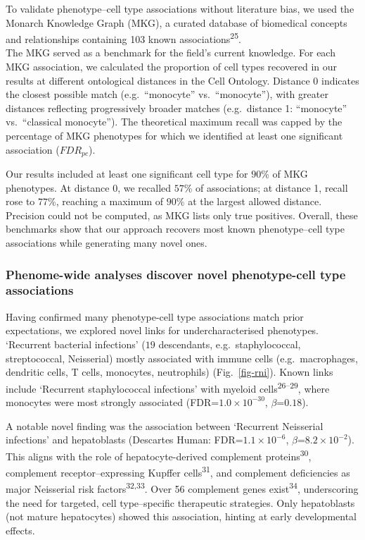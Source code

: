 \documentclass[
]{article}
\begin{document}
To validate phenotype--cell type associations without literature bias,
we used the Monarch Knowledge Graph (MKG), a curated database of
biomedical concepts and relationships containing 103 known
associations\textsuperscript{25}.\\
The MKG served as a benchmark for the field's current knowledge. For
each MKG association, we calculated the proportion of cell types
recovered in our results at different ontological distances in the Cell
Ontology. Distance 0 indicates the closest possible match
(e.g.~``monocyte'' vs.~``monocyte''), with greater distances reflecting
progressively broader matches (e.g.~distance 1: ``monocyte''
vs.~``classical monocyte''). The theoretical maximum recall was capped
by the percentage of MKG phenotypes for which we identified at least one
significant association (\(FDR_{pc}\)).

Our results included at least one significant cell type for \(90\)\% of
MKG phenotypes. At distance 0, we recalled \(57\)\% of associations; at
distance 1, recall rose to \(77\)\%, reaching a maximum of \(90\)\% at
the largest allowed distance. Precision could not be computed, as MKG
lists only true positives. Overall, these benchmarks show that our
approach recovers most known phenotype--cell type associations while
generating many novel ones.

\subsubsection{Phenome-wide analyses discover novel phenotype-cell type
associations}\label{phenome-wide-analyses-discover-novel-phenotype-cell-type-associations}

Having confirmed many phenotype-cell type associations match prior
expectations, we explored novel links for undercharacterised phenotypes.
`Recurrent bacterial infections' (\(19\) descendants,
e.g.~staphylococcal, streptococcal, Neisserial) mostly associated with
immune cells (e.g.~macrophages, dendritic cells, T cells, monocytes,
neutrophils) (Fig.~\ref{fig-rni}). Known links include `Recurrent
staphylococcal infections' with myeloid cells\textsuperscript{26--29},
where monocytes were most strongly associated
(FDR=\(1.0 \times 10^{-30}\), \(\beta\)=\(0.18\)).

A notable novel finding was the association between `Recurrent
Neisserial infections' and hepatoblasts (Descartes Human:
FDR=\(1.1 \times 10^{-6}\), \(\beta\)=\(8.2 \times 10^{-2}\)). This
aligns with the role of hepatocyte-derived complement
proteins\textsuperscript{30}, complement receptor--expressing Kupffer
cells\textsuperscript{31}, and complement deficiencies as major
Neisserial risk factors\textsuperscript{32,33}. Over 56 complement genes
exist\textsuperscript{34}, underscoring the need for targeted, cell
type--specific therapeutic strategies. Only hepatoblasts (not mature
hepatocytes) showed this association, hinting at early developmental
effects.
\end{document}
